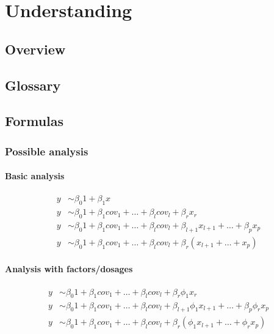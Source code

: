 \chapter{Understanding \oanomm}

\section{Overview}

\section{Glossary}

\section{Formulas}

\subsection{Possible analysis}

\subsubsection{Basic analysis}
\begin{align}
y &\sim \beta_0 1 + \beta_1 x \\
y &\sim \beta_0 1 + \beta_1 cov_1 + \dots + \beta_l cov_l + \beta_r x_r\\
y &\sim \beta_0 1 + \beta_1 cov_1 + \dots + \beta_l cov_l + \beta_{l+1} x_{l+1}  + \dots + \beta_p x_p\\
y &\sim \beta_0 1 + \beta_1 cov_1 + \dots + \beta_l cov_l + \beta_{r} \left(x_{l+1}  + \dots +  x_p\right)
\end{align}

\subsubsection{Analysis with factors/dosages}
\begin{align}
y &\sim \beta_0 1 + \beta_1 cov_1 + \dots + \beta_l cov_l + \beta_r \phi_1 x_r\\
y &\sim \beta_0 1 + \beta_1 cov_1 + \dots + \beta_l cov_l + \beta_{l+1}  \phi_1 x_{l+1}  + \dots + \beta_p  \phi_r x_p\\
y &\sim \beta_0 1 + \beta_1 cov_1 + \dots + \beta_l cov_l + \beta_{r} \left( \phi_1 x_{l+1}  + \dots +   \phi_r x_p\right)
\end{align}

